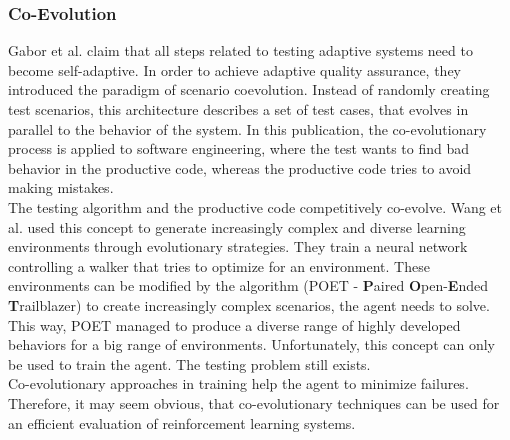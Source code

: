 \subsubsection{Co-Evolution}
\label{coevolutio}
Gabor et al. \cite{gabor18} claim that all steps related to testing adaptive systems need to become self-adaptive. In order to achieve adaptive quality assurance, they introduced the paradigm of scenario coevolution. Instead of randomly creating test scenarios, this architecture describes a set of test cases, that evolves in parallel to the behavior of the system. In this publication, the co-evolutionary process is applied to software engineering, where the test wants to find bad behavior in the productive code, whereas the productive code tries to avoid making mistakes.\\
The testing algorithm and the productive code competitively co-evolve. Wang et al. \cite{wang19} used this concept to generate increasingly complex and diverse learning environments through evolutionary strategies. They train a neural network controlling a walker that tries to optimize for an environment. These environments can be modified by the algorithm (POET - \textbf{P}aired \textbf{O}pen-\textbf{E}nded \textbf{T}railblazer) to create increasingly complex scenarios, the agent needs to solve. This way, POET managed to produce a diverse range of highly developed behaviors for a big range of environments. Unfortunately, this concept can only be used to train the agent. The testing problem still exists.\\
Co-evolutionary approaches in training help the agent to minimize failures. Therefore, it may seem obvious, that co-evolutionary techniques can be used for an efficient evaluation of reinforcement learning systems.